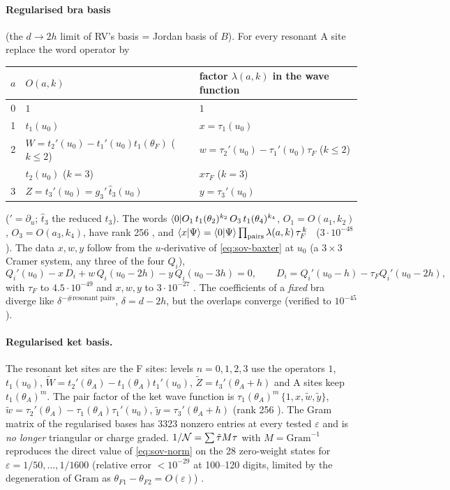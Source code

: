 \paragraph{Regularised bra basis} (the $d\to2h$ limit of RV's basis = Jordan basis of $B$). For every resonant A site replace the word operator by
\begin{center}
\begin{tabular}{cll}
\toprule
$a$ & $O(a,k)$ & factor $\lambda(a,k)$ in the wave function\\
\midrule
0 & $1$ & $1$\\
1 & $t_1(u_0)$ & $x=\tau_1(u_0)$\\
2 & $W=t_2'(u_0)-t_1'(u_0)t_1(\theta_F)$ ($k\le2$) & $w=\tau_2'(u_0)-\tau_1'(u_0)\tau_F$ ($k\le2$)\\
 & $t_2(u_0)$ ($k=3$) & $x\tau_F$ ($k=3$)\\
3 & $Z=t_3'(u_0)=g_3'\,\widehat t_3(u_0)$ & $y=\tau_3'(u_0)$\\
\bottomrule
\end{tabular}
\end{center}
($'=\partial_u$; $\widehat t_3$ the reduced $t_3$). The words $\langle0|O_1\,t_1(\theta_2)^{k_2}\,O_3\,t_1(\theta_4)^{k_4}$, $O_1=O(a_1,k_2)$, $O_3=O(a_3,k_4)$, have rank 256 \ex, and
$\langle x|\Psi\rangle=\langle0|\Psi\rangle\prod_{\rm pairs}\lambda(a,k)\,\tau_F^{\,k}$ \hp\ ($3\cdot10^{-48}$). The data $x,w,y$ follow from the $u$-derivative of \eqref{eq:sov-baxter} at $u_0$ (a $3\times3$ Cramer system, any three of the
four $Q_i$),
\begin{equation}
 Q_i'(u_0)-x\,D_i+w\,Q_i(u_0-2h)-y\,Q_i(u_0-3h)=0,\qquad D_i=Q_i'(u_0-h)-\tau_FQ_i'(u_0-2h),
\end{equation}
with $\tau_F$ to $4.5\cdot10^{-49}$ and $x,w,y$ to $3\cdot10^{-27}$ \hp. The coefficients of a \emph{fixed} bra diverge like $\delta^{-\#\text{resonant pairs}}$, $\delta=d-2h$, but the overlaps converge
(verified to $10^{-45}$).

\paragraph{Regularised ket basis.} The resonant ket sites are the F sites: levels $n=0,1,2,3$ use the operators $1$, $t_1(u_0)$,
$\widetilde W=t_2'(\theta_A)-t_1(\theta_A)t_1'(u_0)$, $\widetilde Z=t_3'(\theta_A+h)$ and A sites keep $t_1(\theta_A)^m$. The pair factor of the ket wave function is
$\tau_1(\theta_A)^m\,\{1,x,\tilde w,\tilde y\}$, $\tilde w=\tau_2'(\theta_A)-\tau_1(\theta_A)\tau_1'(u_0)$, $\tilde y=\tau_3'(\theta_A+h)$ (rank 256 \ex). The Gram matrix of the regularised bases has 3323 nonzero
entries at every tested $\varepsilon$ and is \emph{no longer} triangular or charge graded. $1/\mathcal N=\sum\tilde\tau M\tau$ with $M=\mathrm{Gram}^{-1}$ reproduces the direct value of \eqref{eq:sov-norm} on the 28 zero-weight states for
$\varepsilon=1/50,\dots,1/1600$ (relative error $<10^{-29}$ at 100--120 digits, limited by the degeneration of $\mathrm{Gram}$ as $\theta_{F1}-\theta_{F2}=O(\varepsilon)$) \hp.

